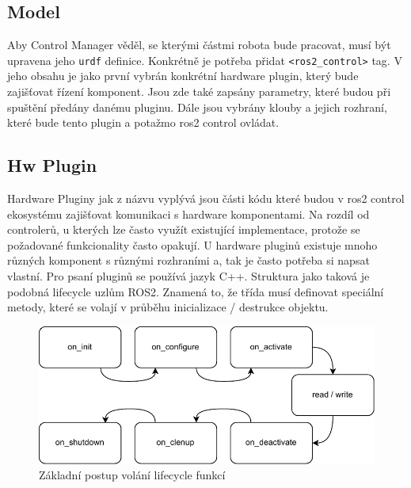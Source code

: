 \subsection*{Model}
Aby Control Manager věděl, se kterými částmi robota bude pracovat, musí být upravena jeho \verb|urdf| definice. Konkrétně je potřeba přidat \verb|<ros2_control>| tag. V jeho obsahu je jako první vybrán konkrétní hardware plugin, který bude zajišťovat řízení komponent. Jsou zde také zapsány parametry, které budou při spuštění předány danému pluginu. Dále jsou vybrány klouby a jejich rozhraní, které bude tento plugin a potažmo ros2 control ovládat. 

\subsection*{Hw Plugin}
Hardware Pluginy jak z názvu vyplývá jsou části kódu které budou v ros2 control ekosystému zajišťovat komunikaci s hardware komponentami. Na rozdíl od controlerů, u kterých lze často využít existující implementace, protože se požadované funkcionality často opakují. U hardware pluginů existuje mnoho různých komponent s různými rozhraními a, tak je často potřeba si napsat vlastní. Pro psaní pluginů se používá jazyk C++. Struktura jako taková je podobná lifecycle uzlům ROS2. Znamená to, že třída musí definovat speciální metody, které se volají v průběhu inicializace / destrukce objektu.

\begin{figure}[h!]
	\centering
	\includegraphics[scale=0.8]{obrazky-figures/ros2_control_wh_plugin_transitions.pdf}
	\caption{Základní postup volání lifecycle funkcí}
	\label{}
\end{figure}

